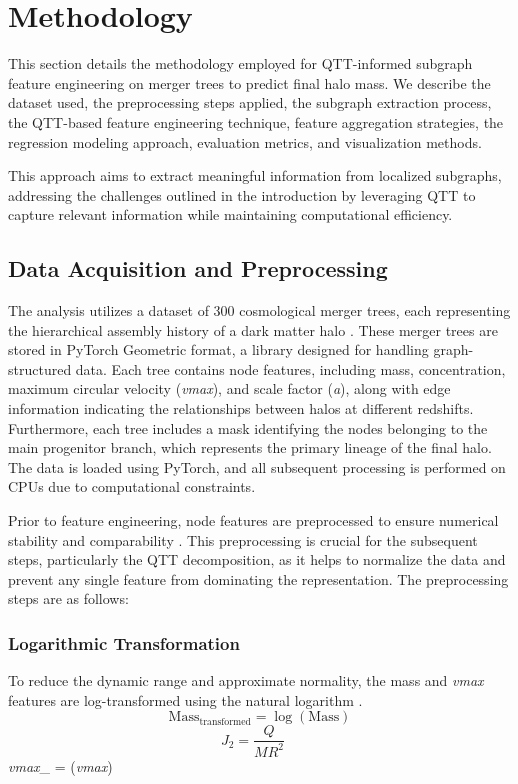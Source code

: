 \documentclass[twocolumn]{aastex631}
\begin{document}
\section{Methodology}
This section details the methodology employed for QTT-informed subgraph feature engineering on merger trees to predict final halo mass. We describe the dataset used, the preprocessing steps applied, the subgraph extraction process, the QTT-based feature engineering technique, feature aggregation strategies, the regression modeling approach, evaluation metrics, and visualization methods.

This approach aims to extract meaningful information from localized subgraphs, addressing the challenges outlined in the introduction by leveraging QTT to capture relevant information while maintaining computational efficiency.

\subsection{Data Acquisition and Preprocessing}
The analysis utilizes a dataset of 300 cosmological merger trees, each representing the hierarchical assembly history of a dark matter halo \citep{parkinson2007generatingdarkmatterhalo,jiang2013generatingmergertreesdark,chandrogómez2025accuracydarkmatterhalo}. These merger trees are stored in PyTorch Geometric format, a library designed for handling graph-structured data. Each tree contains node features, including mass, concentration, maximum circular velocity (\textit{vmax}), and scale factor (\textit{a}), along with edge information indicating the relationships between halos at different redshifts. Furthermore, each tree includes a mask identifying the nodes belonging to the main progenitor branch, which represents the primary lineage of the final halo. The data is loaded using PyTorch, and all subsequent processing is performed on CPUs due to computational constraints.

Prior to feature engineering, node features are preprocessed to ensure numerical stability and comparability \citep{cao2025imagepreprocessingframeworktimedomain,nerval2025atacamacosmologytelescopedevelopment}. This preprocessing is crucial for the subsequent steps, particularly the QTT decomposition, as it helps to normalize the data and prevent any single feature from dominating the representation. The preprocessing steps are as follows:

\subsubsection{Logarithmic Transformation}
To reduce the dynamic range and approximate normality, the mass and \textit{vmax} features are log-transformed using the natural logarithm \citep{seo2011darkenergylogtransformedconvergence,greiner2014logtransformingmatterpowerspectrum,rubira2021effectivefieldtheoryperturbative}.
\[
\text{Mass}_{\text{transformed}} = \log(\text{Mass})
\]
\citep{obrennan2024halomassfunctionshigh,müller2024massradiusrelationexoplanetsrevisited}
\[
J_2 = \frac{Q}{M R^2} \quad
\]
\textit{vmax}_{} = \log(\textit{vmax})
\end{document}
